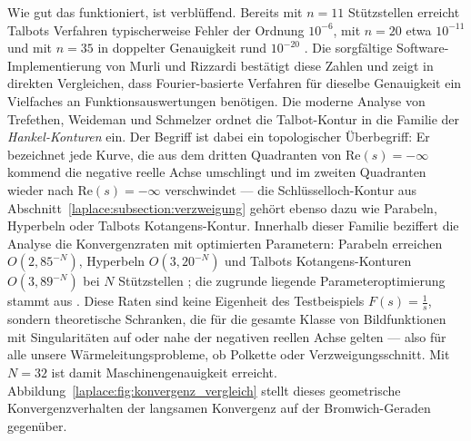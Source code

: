 Wie gut das funktioniert, ist verblüffend.
Bereits mit $n = 11$ Stützstellen erreicht Talbots Verfahren typischerweise
Fehler der Ordnung $10^{-6}$, mit $n = 20$ etwa $10^{-11}$ und mit
$n = 35$ in doppelter Genauigkeit rund $10^{-20}$
\cite{laplace:talbot1979}.
Die sorgfältige Software-Implementierung von Murli und Rizzardi
\cite{laplace:murli1990}
bestätigt
diese Zahlen und zeigt in direkten Vergleichen, dass Fourier-basierte
Verfahren für dieselbe Genauigkeit ein Vielfaches an Funktionsauswertungen
benötigen.
Die moderne Analyse von Trefethen, Weideman und Schmelzer ordnet die
Talbot-Kontur in die Familie der \emph{Hankel-Konturen} ein.
%
Der Begriff ist dabei ein topologischer Überbegriff:
Er bezeichnet jede Kurve, die aus dem dritten Quadranten von
$\text{Re}(s) = -\infty$ kommend die negative reelle Achse umschlingt
und im zweiten Quadranten wieder nach $\text{Re}(s) = -\infty$
verschwindet --- die Schlüsselloch-Kontur aus
Abschnitt~\ref{laplace:subsection:verzweigung} gehört ebenso dazu wie
Parabeln, Hyperbeln oder Talbots Kotangens-Kontur.
Innerhalb dieser Familie beziffert die Analyse die Konvergenzraten mit
optimierten Parametern:
Parabeln erreichen $O(2{,}85^{-N})$, Hyperbeln $O(3{,}20^{-N})$ und
Talbots Kotangens-Konturen $O(3{,}89^{-N})$ bei $N$ Stützstellen
\cite{laplace:trefethen2006}; die zugrunde liegende Parameteroptimierung
stammt aus \cite{laplace:weideman2006}.
Diese Raten sind keine Eigenheit des Testbeispiels $F(s) = \frac{1}{s}$,
sondern theoretische Schranken, die für die gesamte Klasse von
Bildfunktionen mit Singularitäten auf oder nahe der negativen reellen
Achse gelten --- also für alle unsere Wärmeleitungsprobleme, ob Polkette
oder Verzweigungsschnitt.
Mit $N = 32$ ist damit Maschinengenauigkeit erreicht.
Abbildung~\ref{laplace:fig:konvergenz_vergleich} stellt dieses
geometrische Konvergenzverhalten der langsamen Konvergenz auf der
Bromwich-Geraden gegenüber.



